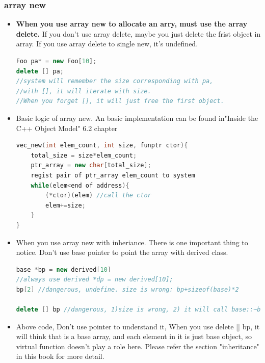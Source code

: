 \documentclass[a4paper,12pt,twoside]{book}
\begin{document}
\subsubsection{array new}
\begin{itemize}
	\item \textbf{When you use array new to allocate an arry, must use the array delete.} If you don't use array delete, maybe you just delete the frist object in array. If you use array delete to single new, it's undefined. 
\begin{lstlisting}[frame=single, language=c++]
Foo pa* = new Foo[10];
delete [] pa;
//system will remember the size corresponding with pa, 
//with [], it will iterate with size. 
//When you forget [], it will just free the first object.
\end{lstlisting}
\item Basic logic of array new. An basic implementation can be found in"Inside the C++ Object Model" 6.2 chapter
\begin{lstlisting}[frame=single, language=c++]
vec_new(int elem_count, int size, funptr ctor){
	total_size = size*elem_count;
	ptr_array = new char[total_size];
	regist pair of ptr_array elem_count to system
	while(elem<end of address){
		(*ctor)(elem) //call the ctor
		elem+=size;
	}
}
\end{lstlisting}
\item When you use array new with inheriance. There is one important thing to notice. Don't use base pointer to point the array with derived class. 
\begin{lstlisting}[frame=single, language=c++]
base *bp = new derived[10]
//always use derived *dp = new derived[10];
bp[2] //dangerous, undefine. size is wrong: bp+sizeof(base)*2

delete [] bp //dangerous, 1)size is wrong, 2) it will call base::~base() destructor. 
\end{lstlisting}
\item Above code, Don't use pointer to understand it, When you use delete [] bp, it will think that is a base array, and each element in it is just base object, so virtual function doesn't play a role here. Please refer the section "inheritance" in this book for more detail.
\end{itemize}
\end{document}
